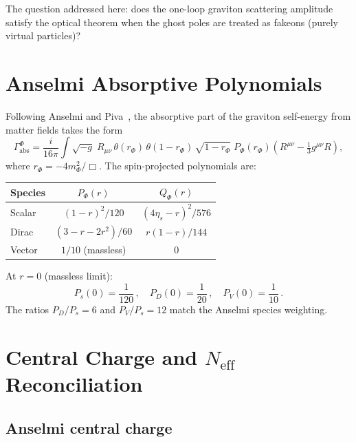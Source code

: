 \documentclass[11pt,a4paper]{article}
\newcommand{\Neff}{N_{\mathrm{eff}}}
\begin{document}
The question addressed here: does the one-loop graviton scattering amplitude
satisfy the optical theorem when the ghost poles are treated as fakeons
(purely virtual particles)?


\section{Anselmi Absorptive Polynomials}

Following Anselmi and Piva~\cite{Anselmi2018}, the absorptive part of the
graviton self-energy from matter fields takes the form
\begin{equation}\label{eq:Gamma_abs}
  \Gamma_{\mathrm{abs}}^{\Phi} = \frac{i}{16\pi}\int\!\sqrt{-g}\;
  R_{\mu\nu}\,\theta(r_\Phi)\,\theta(1-r_\Phi)\,\sqrt{1-r_\Phi}\;
  P_\Phi(r_\Phi)\!\left(R^{\mu\nu} - \tfrac{1}{3}g^{\mu\nu}R\right)\!,
\end{equation}
where $r_\Phi = -4m_\Phi^2/\Box$.  The spin-projected polynomials are:

\begin{center}
\renewcommand{\arraystretch}{1.3}
\begin{tabular}{lcc}
  \toprule
  Species & $P_\Phi(r)$ & $Q_\Phi(r)$ \\
  \midrule
  Scalar  & $(1-r)^2/120$ & $(4\eta_s - r)^2/576$ \\
  Dirac   & $(3 - r - 2r^2)/60$ & $r(1-r)/144$ \\
  Vector  & $1/10$ (massless) & $0$ \\
  \bottomrule
\end{tabular}
\end{center}

At $r = 0$ (massless limit):
\begin{equation}
  P_s(0) = \frac{1}{120}\,,\quad
  P_D(0) = \frac{1}{20}\,,\quad
  P_V(0) = \frac{1}{10}\,.
\end{equation}
The ratios $P_D/P_s = 6$ and $P_V/P_s = 12$ match the Anselmi species weighting.


\section{Central Charge and $\Neff$ Reconciliation}

\subsection{Anselmi central charge}
\end{document}
